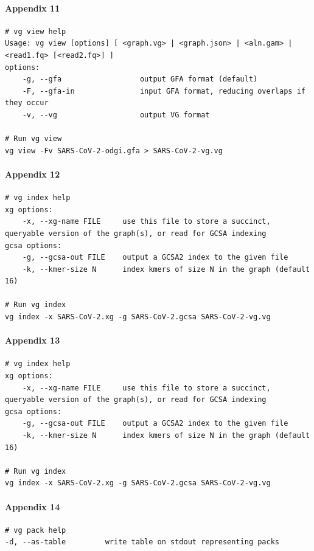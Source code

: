 \documentclass[10pt, a4paper]{article}
\begin{document}
\begin{appendices}
\paragraph{Appendix 11}
\label{sec:org734dd8a}
\begin{verbatim}
# vg view help
Usage: vg view [options] [ <graph.vg> | <graph.json> | <aln.gam> | <read1.fq> [<read2.fq>] ]
options:
    -g, --gfa                  output GFA format (default)
    -F, --gfa-in               input GFA format, reducing overlaps if they occur
    -v, --vg                   output VG format

# Run vg view
vg view -Fv SARS-CoV-2-odgi.gfa > SARS-CoV-2-vg.vg

\end{verbatim}


\paragraph{Appendix 12}
\label{sec:org458aca5}
\begin{verbatim}
# vg index help
xg options:
    -x, --xg-name FILE     use this file to store a succinct, queryable version of the graph(s), or read for GCSA indexing
gcsa options:
    -g, --gcsa-out FILE    output a GCSA2 index to the given file
    -k, --kmer-size N      index kmers of size N in the graph (default 16)

# Run vg index
vg index -x SARS-CoV-2.xg -g SARS-CoV-2.gcsa SARS-CoV-2-vg.vg

\end{verbatim}

\paragraph{Appendix 13}
\label{sec:orge5bc96c}
\begin{verbatim}
# vg index help
xg options:
    -x, --xg-name FILE     use this file to store a succinct, queryable version of the graph(s), or read for GCSA indexing
gcsa options:
    -g, --gcsa-out FILE    output a GCSA2 index to the given file
    -k, --kmer-size N      index kmers of size N in the graph (default 16)

# Run vg index
vg index -x SARS-CoV-2.xg -g SARS-CoV-2.gcsa SARS-CoV-2-vg.vg
\end{verbatim}

\paragraph{Appendix 14}
\label{sec:org53cb611}
\begin{verbatim}
# vg pack help
-d, --as-table         write table on stdout representing packs


\end{verbatim}
\end{appendices}
\end{document}
